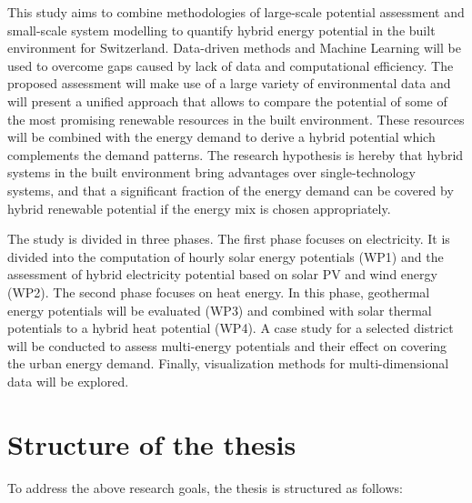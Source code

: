 This study aims to combine methodologies of large-scale potential assessment and small-scale system modelling to quantify hybrid energy potential in the built environment for Switzerland. Data-driven methods and Machine Learning will be used to overcome gaps caused by lack of data and computational efficiency. The proposed assessment will make use of a large variety of environmental data and will present a unified approach that allows to compare the potential of some of the most promising renewable resources in the built environment. These resources will be combined with the energy demand to derive a hybrid potential which complements the demand patterns. The research hypothesis is hereby that hybrid systems in the built environment bring advantages over single-technology systems, and that a significant fraction of the energy demand can be covered by hybrid renewable potential if the energy mix is chosen appropriately.

The study is divided in three phases. The first phase focuses on electricity. It is divided into the computation of hourly solar energy potentials (WP1) and the assessment of hybrid electricity potential based on solar PV and wind energy (WP2). The second phase focuses on heat energy. In this phase, geothermal energy potentials will be evaluated (WP3) and combined with solar thermal potentials to a hybrid heat potential (WP4). A case study for a selected district will be conducted to assess multi-energy potentials and their effect on covering the urban energy demand. Finally, visualization methods for multi-dimensional data will be explored. 


\section{Structure of the thesis}
To address the above research goals, the thesis is structured as follows:

